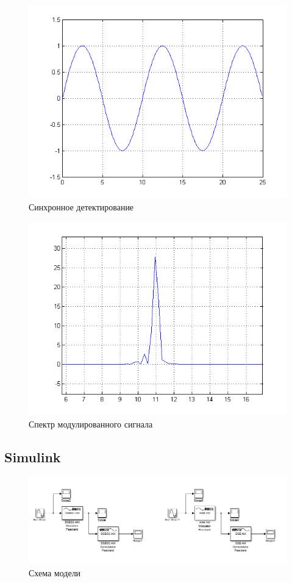 \documentclass[a4paper, 12pt]{article}
\begin{document}
\begin{figure}[H]
   \includegraphics[scale=0.7]{lab7/ssbdemod.png}
   \caption{Синхронное детектирование}
\end{figure}

\begin{figure}[H]
   \includegraphics[scale=0.7]{lab7/ssbdemod_spectro.png}
   \caption{Спектр модулированного сигнала}
\end{figure}


\subsection{Simulink}

\begin{figure}[H]
   \includegraphics[scale=0.5]{lab7/sim_lab7.png}
   \caption{Схема модели}
\end{figure}
\end{document}
